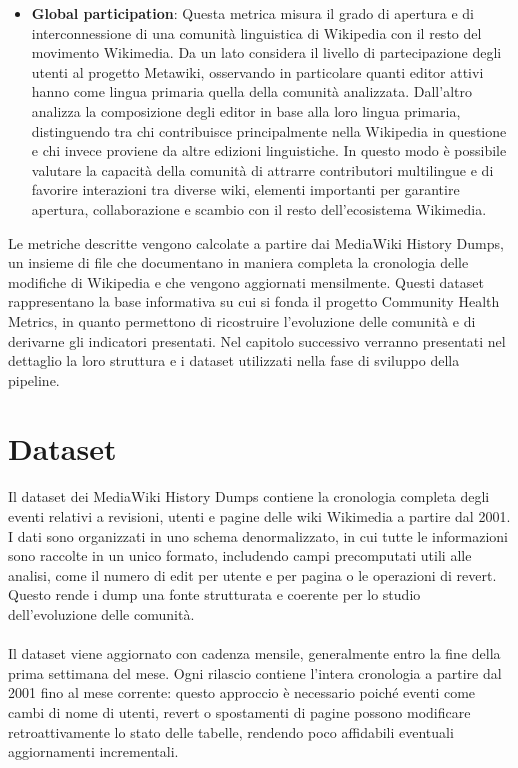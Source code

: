 \begin{itemize}
    \item \textbf{Global participation}: Questa metrica misura il grado di apertura e di interconnessione di una comunità linguistica di Wikipedia con il resto del movimento Wikimedia. Da un lato considera il livello di partecipazione degli utenti al progetto Metawiki, osservando in particolare quanti editor attivi hanno come lingua primaria quella della comunità analizzata. Dall’altro analizza la composizione degli editor in base alla loro lingua primaria, distinguendo tra chi contribuisce principalmente nella Wikipedia in questione e chi invece proviene da altre edizioni linguistiche. In questo modo è possibile valutare la capacità della comunità di attrarre contributori multilingue e di favorire interazioni tra diverse wiki, elementi importanti per garantire apertura, collaborazione e scambio con il resto dell’ecosistema Wikimedia.
\end{itemize}

Le metriche descritte vengono calcolate a partire dai MediaWiki History Dumps, un insieme di file che documentano in maniera completa la cronologia delle modifiche di Wikipedia e che vengono aggiornati mensilmente. Questi dataset rappresentano la base informativa su cui si fonda il progetto Community Health Metrics, in quanto permettono di ricostruire l’evoluzione delle comunità e di derivarne gli indicatori presentati. Nel capitolo successivo verranno presentati nel dettaglio la loro struttura e i dataset utilizzati nella fase di sviluppo della pipeline.
\section{Dataset}
\label{sec:dataset}
Il dataset dei MediaWiki History Dumps contiene la cronologia completa degli eventi relativi a revisioni, utenti e pagine delle wiki Wikimedia a partire dal 2001. I dati sono organizzati in uno schema denormalizzato, in cui tutte le informazioni sono raccolte in un unico formato, includendo campi precomputati utili alle analisi, come il numero di edit per utente e per pagina o le operazioni di revert. Questo rende i dump una fonte strutturata e coerente per lo studio dell’evoluzione delle comunità.
\paragraph{}
Il dataset viene aggiornato con cadenza mensile, generalmente entro la fine della prima settimana del mese. Ogni rilascio contiene l’intera cronologia a partire dal 2001 fino al mese corrente: questo approccio è necessario poiché eventi come cambi di nome di utenti, revert o spostamenti di pagine possono modificare retroattivamente lo stato delle tabelle, rendendo poco affidabili eventuali aggiornamenti incrementali.
